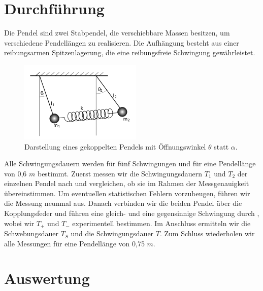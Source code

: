 \section{Durchführung}
Die Pendel sind zwei Stabpendel, die verschiebbare Massen besitzen, um verschiedene Pendellängen zu realisieren. Die
Aufhängung besteht aus einer reibungsarmen Spitzenlagerung, die eine reibungsfreie Schwingung gewährleistet.
\begin{figure}
  \centering
  \includegraphics{gekoppelte_pendel.png}
  \caption{Darstellung eines gekoppelten Pendels mit Öffnungswinkel $\theta$ statt $\alpha$.}
  \label{fig:skizze1}
\end{figure}
Alle Schwingungsdauern werden für fünf Schwingungen und für eine Pendellänge von 0,6 $\textit{m}$ bestimmt. Zuerst messen wir die Schwingungsdauern $\textit{T}_{1}$
und $\textit{T}_{2}$ der einzelnen Pendel nach und vergleichen, ob sie im Rahmen der Messgenauigkeit übereinstimmen. Um eventuellen
statistischen Fehlern vorzubeugen, führen wir die Messung neunmal aus. Danach verbinden wir die beiden Pendel über die Kopplungsfeder und führen eine gleich-
und eine gegensinnige Schwingung durch , wobei wir $\textit{T}_{+}$ und $\textit{T}_{-}$ experimentell bestimmen. Im
Anschluss ermitteln wir die Schwebungsdauer $\textit{T}_{S}$ und die Schwingungsdauer $\textit{T}$. Zum Schluss wiederholen wir
alle Messungen für eine Pendellänge von 0,75 $\textit{m}$.
\section{Auswertung}
